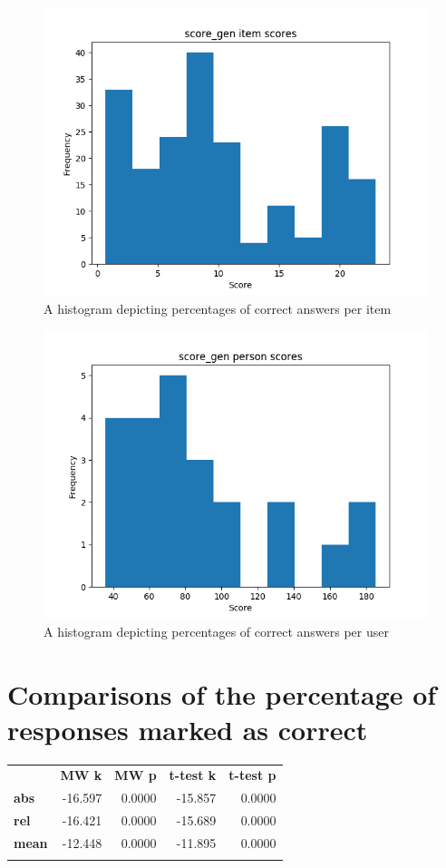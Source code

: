 \begin{figure}
    \centering
    \includegraphics[width=.7\textwidth]{img/score_gen_diff.png}
    \caption{A histogram depicting percentages of correct answers per item}
    \label{fig:score_gen_diff}
\end{figure}
\begin{figure}
    \centering
    \includegraphics[width=.7\textwidth]{img/score_gen_abil.png}
    \caption{A histogram depicting percentages of correct answers per user}
    \label{fig:score_gen_abil}
\end{figure}

\section{Comparisons of the percentage of responses marked as correct}

\begin{longtable}[c]{@{}lrrrr@{}}
\toprule\addlinespace
& \textbf{MW k} & \textbf{MW p} &
\textbf{t-test k} & \textbf{t-test p}
\\\addlinespace
\midrule
\textbf{abs} & -16.597 & 0.0000 & -15.857 & 0.0000
\\\addlinespace
\textbf{rel} & -16.421 & 0.0000 & -15.689 & 0.0000
\\\addlinespace
\textbf{mean} & -12.448 & 0.0000 & -11.895 & 0.0000
\\\addlinespace
\bottomrule
    \label{tab:score_comp}
\end{longtable}

